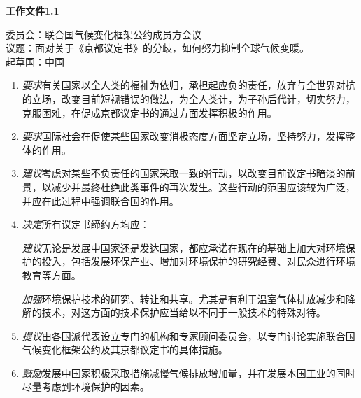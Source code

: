 \documentclass[a4paper,openany]{book}
\begin{document}
\begin{spacing}{1}
\setlength{\parskip}{0em}

\centerline{\textbf{\large 工作文件1.1}}

\vspace{1em}

\noindent 委员会：联合国气候变化框架公约成员方会议 \\
议题：面对关于《京都议定书》的分歧，如何努力抑制全球气候变暖。 \\
起草国：中国

\vspace{1em}

\begin{enumerate}
\setlength{\itemsep}{0pt}
\setlength{\parsep}{0pt}
\setlength{\parskip}{0pt}

\item \textit{要求}有关国家以全人类的福祉为依归，承担起应负的责任，放弃与全世界对抗的立场，改变目前短视错误的做法，为全人类计，为子孙后代计，切实努力，克服困难，在促成京都议定书的通过方面发挥积极的作用。 

\item \textit{要求}国际社会在促使某些国家改变消极态度方面坚定立场，坚持努力，发挥整体的作用。 

\item \textit{建议}考虑对某些不负责任的国家采取一致的行动，以改变目前议定书暗淡的前景，以减少并最终杜绝此类事件的再次发生。这些行动的范围应该较为广泛，并应在此过程中强调联合国的作用。 

\item \textit{决定}所有议定书缔约方均应： 

\iitem \textit{建议}无论是发展中国家还是发达国家，都应承诺在现在的基础上加大对环境保护的投入，包括发展环保产业、增加对环境保护的研究经费、对民众进行环境教育等方面。 

\iitem \textit{加强}环境保护技术的研究、转让和共享。尤其是有利于温室气体排放减少和降解的技术，对这方面的技术保护应当给以不同于一般技术的特殊对待。 

\item \textit{提议}由各国派代表设立专门的机构和专家顾问委员会，以专门讨论实施联合国气候变化框架公约及其京都议定书的具体措施。 

\item \textit{鼓励}发展中国家积极采取措施减慢气候排放增加量，并在发展本国工业的同时尽量考虑到环境保护的因素。 

\end{enumerate}
\end{spacing}
\newpage
\end{document}
